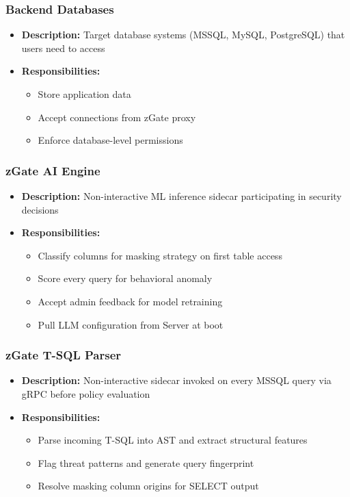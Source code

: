 \subsubsection{Backend Databases}
\begin{itemize}
    \item \textbf{Description:} Target database systems (MSSQL, MySQL, PostgreSQL) that users need to access
    \item \textbf{Responsibilities:}
    \begin{itemize}
        \item Store application data
        \item Accept connections from zGate proxy
        \item Enforce database-level permissions
    \end{itemize}
\end{itemize}

\subsubsection{zGate AI Engine}
\begin{itemize}
    \item \textbf{Description:} Non-interactive ML inference sidecar participating in security decisions
    \item \textbf{Responsibilities:}
    \begin{itemize}
        \item Classify columns for masking strategy on first table access
        \item Score every query for behavioral anomaly
        \item Accept admin feedback for model retraining
        \item Pull LLM configuration from Server at boot
    \end{itemize}
\end{itemize}

\subsubsection{zGate T-SQL Parser}
\begin{itemize}
    \item \textbf{Description:} Non-interactive sidecar invoked on every MSSQL query via gRPC before policy evaluation
    \item \textbf{Responsibilities:}
    \begin{itemize}
        \item Parse incoming T-SQL into AST and extract structural features
        \item Flag threat patterns and generate query fingerprint
        \item Resolve masking column origins for SELECT output
    \end{itemize}
\end{itemize}

